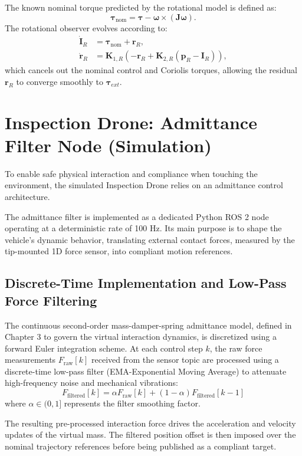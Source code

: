 The known nominal torque predicted by the rotational model is defined as:
\begin{equation} \label{eq:tau_nom}
    \boldsymbol{\tau}_{\text{nom}} = \boldsymbol{\tau} - \boldsymbol{\omega} \times (\mathbf{J} \boldsymbol{\omega}).
\end{equation}
The rotational observer evolves according to:
\begin{align}
    \dot{\mathbf{I}}_R &= \boldsymbol{\tau}_{\text{nom}} + \mathbf{r}_R, \label{eq:mbe_rot_I} \\
    \dot{\mathbf{r}}_R &= \mathbf{K}_{1,R} \left( -\mathbf{r}_R + \mathbf{K}_{2,R} (\mathbf{p}_R - \mathbf{I}_R) \right), \label{eq:mbe_rot_r}
\end{align}
which cancels out the nominal control and Coriolis torques, allowing the residual $\mathbf{r}_R$ to converge smoothly to $\boldsymbol{\tau}_{ext}$.


\section{Inspection Drone: Admittance Filter Node (Simulation)}
To enable safe physical interaction and compliance when touching the environment, the simulated Inspection Drone relies on an admittance control architecture.

\noindent The admittance filter is implemented as a dedicated Python ROS 2 node operating at a deterministic rate of 100 Hz. Its main purpose is to shape the vehicle's dynamic behavior, translating external contact forces, measured by the tip-mounted 1D force sensor, into compliant motion references. 

\subsection{Discrete-Time Implementation and Low-Pass Force Filtering}
The continuous second-order mass-damper-spring admittance model, defined in Chapter 3 to govern the virtual interaction dynamics, is discretized using a forward Euler integration scheme. At each control step $k$, the raw force measurements $F_{\text{raw}}[k]$ received from the sensor topic are processed using a discrete-time low-pass filter (EMA-Exponential Moving Average) to attenuate high-frequency noise and mechanical vibrations:
$$F_{\text{filtered}}[k] = \alpha F_{\text{raw}}[k] + (1 - \alpha) F_{\text{filtered}}[k-1]$$
where $\alpha \in (0, 1]$ represents the filter smoothing factor. 

\noindent The resulting pre-processed interaction force drives the acceleration and velocity updates of the virtual mass. The filtered position offset is then imposed over the nominal trajectory references before being published as a compliant target.

